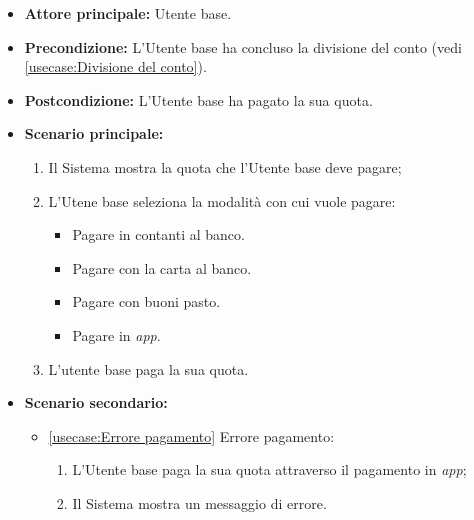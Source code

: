 \label{usecase:Pagamento del conto}
\begin{itemize}
	\item \textbf{Attore principale:} Utente base.

	\item \textbf{Precondizione:} L'Utente base ha concluso la divisione del conto (vedi \autoref{usecase:Divisione del conto}).

	\item \textbf{Postcondizione:} L'Utente base ha pagato la sua quota.

	\item \textbf{Scenario principale:}
            \begin{enumerate}
                \item Il Sistema mostra la quota che l'Utente base deve pagare;
                \item L'Utene base seleziona la modalità con cui vuole pagare:
                \begin{itemize}
                    \item Pagare in contanti al banco.
                    \item Pagare con la carta al banco.
                    \item Pagare con buoni pasto.
                    \item Pagare in \textit{app}.
                \end{itemize}
				\item L'utente base paga la sua quota.
	      \end{enumerate}

    \item \textbf{Scenario secondario:}
		  \begin{itemize}
			  \item \autoref{usecase:Errore pagamento} Errore pagamento:
				\begin{enumerate}
					\item L'Utente base paga la sua quota attraverso il pagamento in \textit{app};
					\item  Il Sistema mostra un messaggio di errore.
				\end{enumerate}
		  \end{itemize}
\end{itemize}